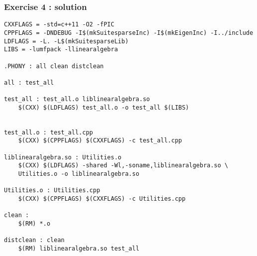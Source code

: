 \documentclass[9pt]{beamer}
\begin{document}
\begin{frame}\frametitle{Exercise 4 : solution}
\begin{verbatim}
CXXFLAGS = -std=c++11 -O2 -fPIC
CPPFLAGS = -DNDEBUG -I$(mkSuitesparseInc) -I$(mkEigenInc) -I../include
LDFLAGS = -L. -L$(mkSuitesparseLib)
LIBS = -lumfpack -llinearalgebra

.PHONY : all clean distclean

all : test_all

test_all : test_all.o liblinearalgebra.so
	$(CXX) $(LDFLAGS) test_all.o -o test_all $(LIBS)


test_all.o : test_all.cpp
	$(CXX) $(CPPFLAGS) $(CXXFLAGS) -c test_all.cpp

liblinearalgebra.so : Utilities.o
	$(CXX) $(LDFLAGS) -shared -Wl,-soname,liblinearalgebra.so \
	Utilities.o -o liblinearalgebra.so

Utilities.o : Utilities.cpp
	$(CXX) $(CPPFLAGS) $(CXXFLAGS) -c Utilities.cpp

clean :
	$(RM) *.o 

distclean : clean
	$(RM) liblinearalgebra.so test_all
\end{verbatim}
\end{frame}
\end{document}
